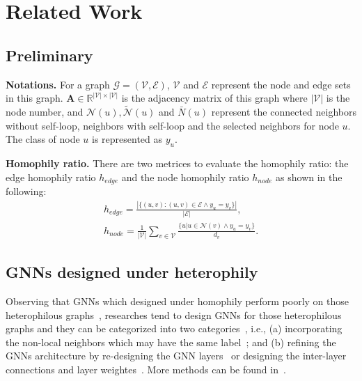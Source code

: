 \documentclass[sigconf]{acmart}
\begin{document}
\section{Related Work}
\subsection{Preliminary}
\label{sec-preliminary}
\noindent\textbf{Notations.} 
For a graph $\mathcal{G} =(\mathcal{V}, \mathcal{E}) $,  $\mathcal{V}$ and $\mathcal{E}$ represent the node and edge sets in this graph. $\textbf{A} \in \mathbb{R}^{|\mathcal{V}| \times |\mathcal{V}|}$ is the adjacency matrix of this graph where $|\mathcal{V}|$ is the node number, and $\mathcal{N}(u), \tilde{\mathcal{N}}(u)$ and $\bar{N}(u)$ represent the connected neighbors without self-loop, neighbors with self-loop and the selected neighbors for node $u$. The class of node $u$ is represented as $y_u$.


\noindent\textbf{Homophily ratio.} There are two metrices to evaluate the homophily ratio: the edge homophily ratio $h_{edge}$ and the node homophily ratio $h_{node}$ as shown in the following:
\begin{align}
	\nonumber
	h_{edge} = \frac{\left| \{(u,v):(u,v) \in \mathcal{E} \wedge y_u=y_v\}\right|}{\left| \mathcal{E} \right|}, \\ 
	\nonumber
	h_{node} = \frac{1}{|\mathcal{V}|} \sum_{v \in \mathcal{V}} \frac{\{u| u \in \mathcal{N}(v) \wedge y_u=y_v\}}{d_v}. 
\end{align}

\subsection{GNNs designed under heterophily}
Observing that GNNs which designed under homophily perform poorly on those heterophilous graphs~\cite{pei2020geom,zhu2020beyond}, researches tend to design GNNs for those heterophilous graphs and they can be categorized into two categories~\cite{zheng2022graph}, i.e., (a) incorporating the non-local neighbors which may have the same label~\cite{pei2020geom,suresh2021breaking,jin2021universal,wang2022graph}; 
and (b) refining the GNNs architecture by re-designing the GNN layers~\cite{du2022gbk,yan2021two,fang2022polarized,zhu2020beyond} or designing the inter-layer connections and layer weightes~\cite{wei2022designing,zhu2020beyond,chen2020measuring}.  More methods can be found in~\cite{zheng2022graph}.
\end{document}
